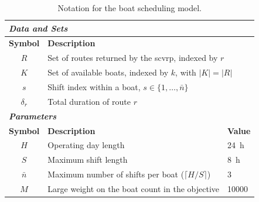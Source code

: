 \documentclass[12pt]{article}
\begin{document}
\begin{table}[htbp]
  \centering
  \caption{Notation for the boat scheduling model.}
  \label{tab:scheduling_notation}
  \renewcommand{\arraystretch}{1.3}
  \begin{tabularx}{\textwidth}{c X l}
    \toprule

    \multicolumn{3}{l}{\textbf{\textit{Data and Sets}}}                                                                                                                           \\
    \midrule
    \textbf{Symbol} & \textbf{Description}                                                                                                                                        \\
    \midrule
    \(R\)           & \multicolumn{2}{l}{Set of routes returned by the \ac{scvrp}, indexed by \(r\)}                                                                              \\
    \(K\)           & \multicolumn{2}{l}{Set of available boats, indexed by \(k\), with \(|K| = |R|\)}                                                                            \\
    \(s\)           & \multicolumn{2}{l}{Shift index within a boat, \(s \in \{1, \ldots, \bar{n}\}\)}                                                                             \\
    \(\delta_r\)    & \multicolumn{2}{l}{Total duration of route \(r\)}                                                                                                           \\
    \midrule

    \multicolumn{3}{l}{\textbf{\textit{Parameters}}}                                                                                                                              \\
    \midrule
    \textbf{Symbol} & \textbf{Description}                                                                                                              & \textbf{Value}          \\
    \midrule
    \(H\)           & Operating day length                                                                                                              & \qty{24}{\hour}         \\
    \(S\)           & Maximum shift length                                                                                                              & \qty{8}{\hour}          \\
    \(\bar{n}\)     & Maximum number of shifts per boat (\(\lceil H / S \rceil\))                                                                       & 3                       \\
    \(M\)           & Large weight on the boat count in the objective                                                                                   & \num{10000}             \\
    \midrule


\end{tabularx}
\end{table}
\end{document}
